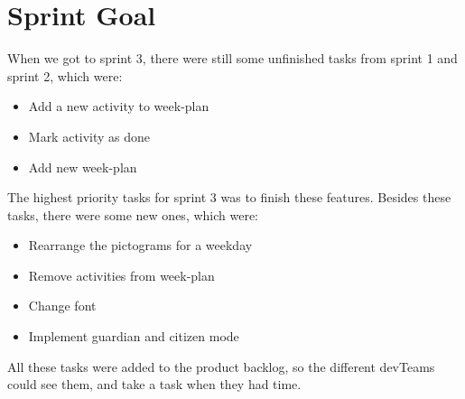 \section{Sprint Goal}

When we got to sprint 3, there were still some unfinished tasks from sprint 1 and sprint 2, which were:

\begin{itemize}
    \item Add a new activity to week-plan
    \item Mark activity as done 
    \item Add new week-plan
\end{itemize}

The highest priority tasks for sprint 3 was to finish these features.
Besides these tasks, there were some new ones, which were:

\begin{itemize}
    \item Rearrange the pictograms for a weekday
    \item Remove activities from week-plan
    \item Change font
    \item Implement guardian and citizen mode
\end{itemize}

All these tasks were added to the product backlog, so the different \glspl{devTeam} could see them, and take a task when they had time.